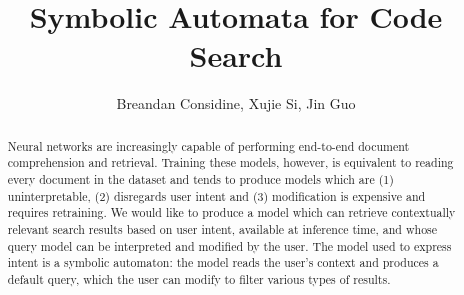 \documentclass[sigconf]{acmart}
\begin{document}
  \title{Symbolic Automata for Code Search}

  \author{Breandan Considine, Xujie Si, Jin Guo}


  \begin{abstract}
    Neural networks are increasingly capable of performing end-to-end document comprehension and retrieval. Training these models, however, is equivalent to reading every document in the dataset and tends to produce models which are (1) uninterpretable, (2) disregards user intent and (3) modification is expensive and requires retraining. We would like to produce a model which can retrieve contextually relevant search results based on user intent, available at inference time, and whose query model can be interpreted and modified by the user. The model used to express intent is a symbolic automaton: the model reads the user's context and produces a default query, which the user can modify to filter various types of results.
  \end{abstract}


  \maketitle
\end{document}
